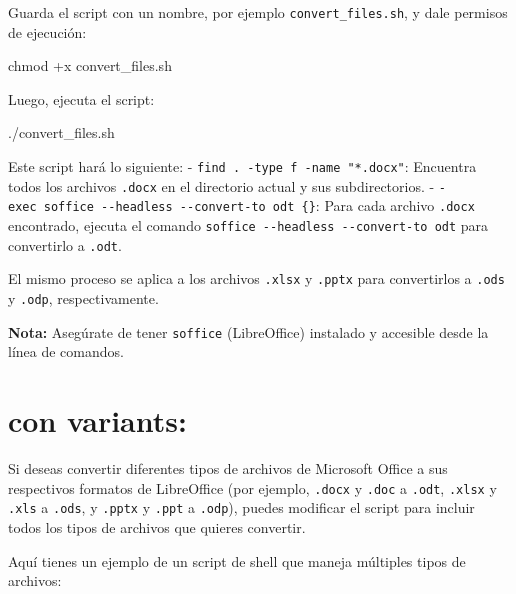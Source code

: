 \documentclass[
  jou,
  floatsintext,
  longtable,
  a4paper,
  nolmodern,
  notxfonts,
  notimes,
  12pt,
  colorlinks=true,linkcolor=blue,citecolor=blue,urlcolor=blue]{apa7}
\newenvironment{Shaded}{\begin{snugshade}}{\end{snugshade}}
\newcommand{\ExtensionTok}[1]{\textcolor[rgb]{0.00,0.23,0.31}{#1}}
\newcommand{\FunctionTok}[1]{\textcolor[rgb]{0.28,0.35,0.67}{#1}}
\newcommand{\NormalTok}[1]{\textcolor[rgb]{0.00,0.23,0.31}{#1}}
\begin{document}
Guarda el script con un nombre, por ejemplo \texttt{convert\_files.sh},
y dale permisos de ejecución:

\begin{Shaded}
\begin{Highlighting}[]
\FunctionTok{chmod}\NormalTok{ +x convert\_files.sh}
\end{Highlighting}
\end{Shaded}

Luego, ejecuta el script:

\begin{Shaded}
\begin{Highlighting}[]
\ExtensionTok{./convert\_files.sh}
\end{Highlighting}
\end{Shaded}

Este script hará lo siguiente: -
\texttt{find\ .\ -type\ f\ -name\ "*.docx"}: Encuentra todos los
archivos \texttt{.docx} en el directorio actual y sus subdirectorios. -
\texttt{-exec\ soffice\ -\/-headless\ -\/-convert-to\ odt\ \{\}}: Para
cada archivo \texttt{.docx} encontrado, ejecuta el comando
\texttt{soffice\ -\/-headless\ -\/-convert-to\ odt} para convertirlo a
\texttt{.odt}.

El mismo proceso se aplica a los archivos \texttt{.xlsx} y
\texttt{.pptx} para convertirlos a \texttt{.ods} y \texttt{.odp},
respectivamente.

\textbf{Nota:} Asegúrate de tener \texttt{soffice} (LibreOffice)
instalado y accesible desde la línea de comandos.

\section{con variants:}\label{con-variants}

Si deseas convertir diferentes tipos de archivos de Microsoft Office a
sus respectivos formatos de LibreOffice (por ejemplo, \texttt{.docx} y
\texttt{.doc} a \texttt{.odt}, \texttt{.xlsx} y \texttt{.xls} a
\texttt{.ods}, y \texttt{.pptx} y \texttt{.ppt} a \texttt{.odp}), puedes
modificar el script para incluir todos los tipos de archivos que quieres
convertir.

Aquí tienes un ejemplo de un script de shell que maneja múltiples tipos
de archivos:
\end{document}
